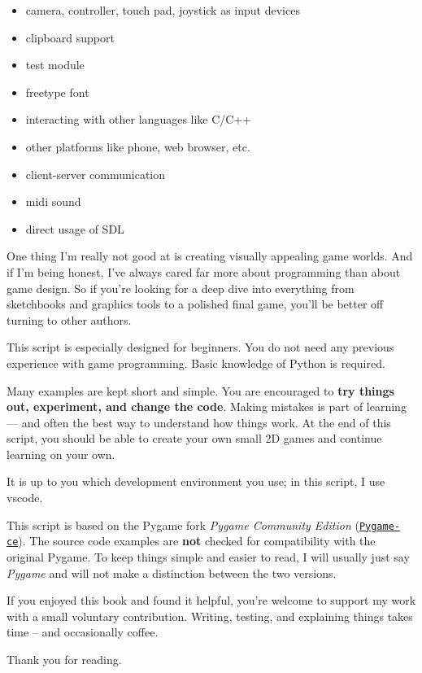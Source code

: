 \begin{warningbox}
\begin{itemize}
	\item camera, controller, touch pad, joystick as input devices
	\item clipboard support
	\item test module
	\item freetype font
	\item interacting with other languages like C/C++
	\item other platforms like phone, web browser, etc.
	\item client-server communication
	\item midi sound
	\item direct usage of SDL
\end{itemize}
\end{warningbox}

One thing I’m really not good at is creating visually appealing game worlds. And if I’m being honest, I’ve always cared far more about programming than about game design. So if you’re looking for a deep dive into everything from sketchbooks and graphics tools to a polished final game, you’ll be better off turning to other authors. 

This script is especially designed for beginners. You do not need any previous experience with game programming. Basic knowledge of Python is required.

Many examples are kept short and simple. You are encouraged to \textbf{try things out, experiment, and change the code}. Making mistakes is part of learning — and often the best way to understand how things work. At the end of this script, you should be able to create your own small 2D games and continue learning on your own.

It is up to you which development environment you use; in this script, I use \Gls{vscode}.

This script is based on the Pygame fork \emph{Pygame Community Edition} (\href{https://pyga.me/}{\nolinkurl{Pygame-ce}}). The source code examples are \textbf{not} checked for compatibility with the original Pygame. To keep things simple and easier to read, I will usually just say \emph{Pygame} and will not make a distinction between the two versions.

\newpage
\begin{hintbox}
If you enjoyed this book and found it helpful, you’re welcome to support my work with a small voluntary contribution. Writing, testing, and explaining things takes time -- and occasionally coffee.


Thank you for reading.
\end{hintbox}

